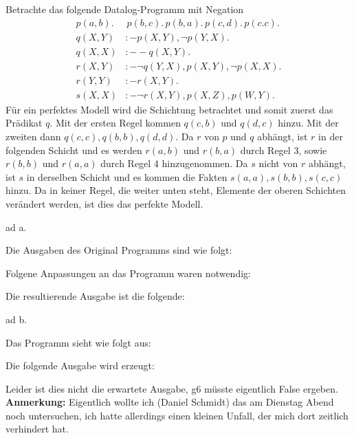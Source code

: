 \documentclass[12pt,a4paper]{amsart}
\begin{document}
\begin{aufgabe1}
Betrachte das folgende Datalog-Programm mit Negation
\begin{equation*}
\begin{split}
 p(a,b).&\,p(b,c).\,p(b,a).\,p(c,d).\,p(c.c).\\
 q(X,Y) &:- p(X,Y),\lnot p(Y,X).\\
 q(X,X) &:- -q(X,Y).\\
 r(X,Y)&:-\lnot q(Y,X),p(X,Y),\lnot p(X,X).\\
 r(Y,Y)&:-r(X,Y).\\
 s(X,X) &:- \lnot r(X,Y),p(X,Z),p(W,Y).
 \end{split}
\end{equation*}
Für ein perfektes Modell wird die Schichtung betrachtet und somit zuerst das Prädikat $q$. Mit der ersten Regel kommen $q(c,b)$ und $q(d,c)$ hinzu. Mit der zweiten dann
$q(c,c),q(b,b),q(d,d)$. Da $r$ von $p$ und $q$ abhängt, ist $r$ in der folgenden Schicht und es werden $r(a,b)$ und $r(b,a)$ durch Regel 3, sowie $r(b,b)$ und $r(a,a)$ durch
Regel 4 hinzugenommen. Da $s$ nicht von $r$ abhängt, ist $s$ in derselben Schicht und es kommen die Fakten $s(a,a), s(b,b),s(c,c)$ hinzu. Da in keiner Regel, die weiter unten
steht, Elemente der oberen Schichten verändert werden, ist dies das perfekte Modell.
\end{aufgabe1}

\begin{aufgabe1}
ad a.

Die Ausgaben des Original Programms sind wie folgt:


Folgene Anpassungen an das Programm waren notwendig:


Die resultierende Ausgabe ist die folgende:


\medskip

ad b.

Das Programm sieht wie folgt aus:


Die folgende Ausgabe wird erzeugt:


Leider ist dies nicht die erwartete Ausgabe, g6 müsste eigentlich False ergeben. \\
\textbf{Anmerkung:} Eigentlich wollte ich (Daniel Schmidt) das am Dienstag Abend noch untersuchen, ich hatte allerdings einen kleinen Unfall, der mich dort zeitlich verhindert hat.

\end{aufgabe1}
\end{document}

